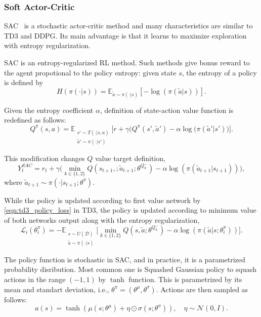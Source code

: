 \subsubsection{Soft Actor-Critic}
SAC~\cite{haarnoja_soft_2018} is a stochastic actor-critic method and many characteristics are similar to TD3 and DDPG. Its main advantage is that it learns to maximize exploration with entropy regularization. 

SAC is an entropy-regularized RL method. Such methods give bonus reward to the agent propotional to the policy entropy: given state $s$, the entropy of a policy is defined by
\begin{equation}
\label{eqn:policy_entropy}
H(\pi(\cdot|s)) = \mathbb{E}_{\widetilde{a}\sim\pi(\cdot|s)}[-\log(\pi(\widetilde{a}|s))].
\end{equation}

Given the entropy coefficient $\alpha$, definition of state-action value function is redefined as follows: 
\begin{equation}
\label{eqn:q_dfn_entreg}
Q^{\pi}(s,a) = \mathbb{E}_{\substack{s'\sim T(\cdot|s,a)\\\widetilde{a}'\sim \pi(\cdot|s')} } \Big[r + \gamma \Big(Q^{\pi}(s',\widetilde{a}') -\alpha\log(\pi(\widetilde{a}'|s') \Big) \Big]. %
\end{equation}

This modification changes $Q$ value target definition,
\begin{equation}
\label{eqn:q_target_sac}
Y_t^{SAC} = r_t + \gamma \Big(\min_{k\in\{1,2\}} Q(s_{t+1}, ;\widetilde{a}_{t+1};\theta^{Q_k^-}) -\alpha\log(\pi(\widetilde{a}_{t+1}|s_{t+1})) \Big),
\end{equation}
where $\widetilde{a}_{t+1} \sim \pi(\cdot|s_{t+1}; \theta^{\pi})$.

While the policy is updated according to first value network by \eqref{eqn:td3_policy_loss} in TD3, the policy is updated according to minimum value of both networks output along with the entropy regularization, 
\begin{equation}
\label{eqn:sac_policy_loss}
\mathcal{L}_i(\theta^\pi_i) = - \mathbb{E}_{\substack{s \sim U(\mathcal{D})\\\widetilde{a} \sim \pi(\cdot|s)}} \Big[ \min_{k\in\{1,2\}} Q(s, \widetilde{a};\theta^{Q_k^-}) - \alpha\log(\pi(\widetilde{a}|s;\theta^\pi_i)) \Big].
\end{equation}

The policy function is stochastic in SAC, and in practice, it is a parametrized probability disribution. Most common one is 
Squashed Gaussian policy to squash actions in the range $(-1,1)$ by $\tanh$ function. 
This is parametrized by its mean and standart deviation, i.e., $\theta^{\pi}=(\theta^{\mu}, \theta^{\sigma})$. Actions are then sampled as follows: 
\begin{equation}
\label{eqn:squashed_gp_sampling}
a(s) = \tanh(\mu(s; \theta^{\mu}) + \eta \odot \sigma(s; \theta^{\sigma})), \quad \eta \sim \mathcal{N}(0, I). 
\end{equation}

